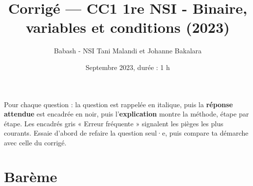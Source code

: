 \documentclass[addpoints, 11pt]{exam}
\title{Corrigé --- CC1 1re NSI - Binaire, variables et conditions (2023)}
\author{Babash - NSI Tani Malandi et Johanne Bakalara}
\date{Septembre 2023, durée : 1 h}
\DeclareRobustCommand{\_}{\textunderscore\allowbreak}
\begin{document}
\pagestyle{headandfoot}
\firstpageheader{}{}{}

\maketitle
\thispagestyle{headandfoot}

\begin{astuce}
Pour chaque question : la question est rappelée en italique, puis la \textbf{réponse attendue} est encadrée en noir, puis l'\textbf{explication} montre la méthode, étape par étape.
Les encadrés gris « Erreur fréquente » signalent les pièges les plus courants. Essaie d'abord de refaire la question seul·e, puis compare ta démarche avec celle du corrigé.
\end{astuce}

\section*{Barème}
\begin{center}
  \gradetable[h]
\end{center}
\end{document}

